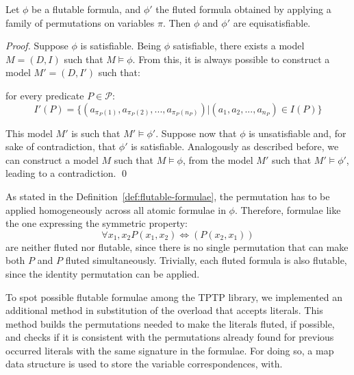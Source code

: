 \begin{lemma}
  Let \(\phi\) be a flutable formula, and \(\phi'\) the fluted formula obtained by applying a family of permutations on variables \(\pi\).
  Then \(\phi\) and \(\phi'\) are equisatisfiable.
\end{lemma}

\begin{proof}
  Suppose \(\phi\) is satisfiable.
  Being \(\phi\) satisfiable, there exists a model \(M = (D,I)\) such that \(M \models \phi\).
  From this, it is always possible to construct a model \(M' = (D,I')\) such that:
  
  for every predicate \(P \in \mathcal{P}\):
  \[I'(P) = \{(a_{\pi_P(1)}, a_{\pi_P(2)}, ..., a_{\pi_P(n_P)}) | (a_1, a_2, ..., a_{n_P}) \in I(P)\}\]

  This model \(M'\) is such that \(M' \models \phi'\).
  Suppose now that \(\phi\) is unsatisfiable and, for sake of contradiction, that \(\phi'\) is satisfiable.
  Analogously as described before, we can construct a model \(M\) such that \(M \models \phi\), from the model \(M'\) such that \(M' \models \phi'\), leading to a contradiction.
  \qed{}
\end{proof}

As stated in the Definition~\ref{def:flutable-formulae}, the permutation has to be applied homogeneously across all atomic formulae in \(\phi\).
Therefore, formulae like the one expressing the symmetric property:
\[
  \forall x_1,x_2 P(x_1,x_2) \iff (P(x_2,x_1))
\]
are neither fluted nor flutable, since there is no single permutation that can make both \(P\) and \(P\) fluted simultaneously.
Trivially, each fluted formula is also flutable, since the identity permutation can be applied.

To spot possible flutable formulae among the TPTP library, we implemented an additional method  in substitution of the  overload that accepts literals.
This method builds the permutations needed to make the literals fluted, if possible, and checks if it is consistent with the permutations already found for previous occurred literals with the same signature in the formulae.
For doing so, a map data structure is used to store the variable correspondences, with.

